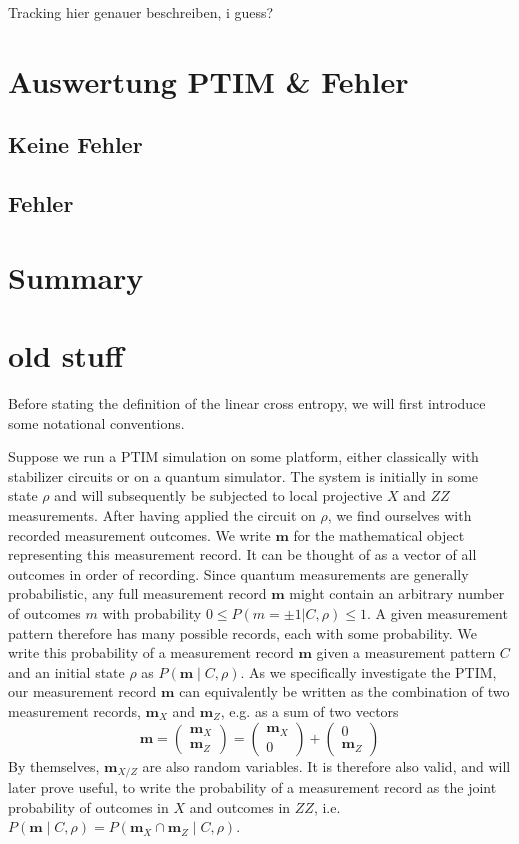 Tracking hier genauer beschreiben, i guess?
\section{Auswertung PTIM \& Fehler}
\subsection{Keine Fehler}
\subsection{Fehler}

\section{Summary}

\section{old stuff}
Before stating the definition of the linear cross entropy, we will first
introduce some notational conventions.

Suppose we run a PTIM simulation on some platform, either classically with
stabilizer circuits or on a quantum simulator. The system is initially in some
state $\rho$ and will subsequently be subjected to local projective $X$ and
$ZZ$ measurements.  After having applied the circuit on $\rho$, we find
ourselves with recorded measurement outcomes. We write $\mathbf{m}$ for the
mathematical object representing this measurement record. It can be
thought of as a vector of all outcomes in order of recording.
Since quantum measurements are generally probabilistic, any full
measurement record $\mathbf{m}$ might contain an arbitrary number of outcomes
$m$ with probability $0\leq P(m=\pm 1 | C, \rho)\leq 1$. A given
measurement pattern therefore has many possible records, each with some
probability.  We write this probability of a measurement record $\mathbf{m}$
given a measurement pattern $C$ and an initial state $\rho$ as $P(\mathbf{m}
\mid C, \rho)$. As we specifically investigate the PTIM, our measurement record
$\mathbf{m}$ can equivalently be written as the combination of two measurement
records, $\mathbf{m}_X$ and $\mathbf{m}_{Z}$, e.g. as a sum of two vectors
\[
  \mathbf{m} = \begin{pmatrix} \mathbf{m}_X \\ \mathbf{m}_Z \end{pmatrix} 
  = \begin{pmatrix} \mathbf{m}_X \\ 0 \end{pmatrix} + \begin{pmatrix}
0 \\ \mathbf{m}_Z \end{pmatrix} 
\]
By themselves, $\mathbf{m}_{X/Z}$ are also random variables.
It is therefore also valid, and will later prove useful, to
write the probability of a measurement record as the joint probability of
outcomes in $X$ and outcomes in $ZZ$, i.e.  $P\left(\mathbf{m} \mid C,
\rho\right) = P\left(\mathbf{m}_X\cap \mathbf{m}_Z\mid C,\rho\right)$.


